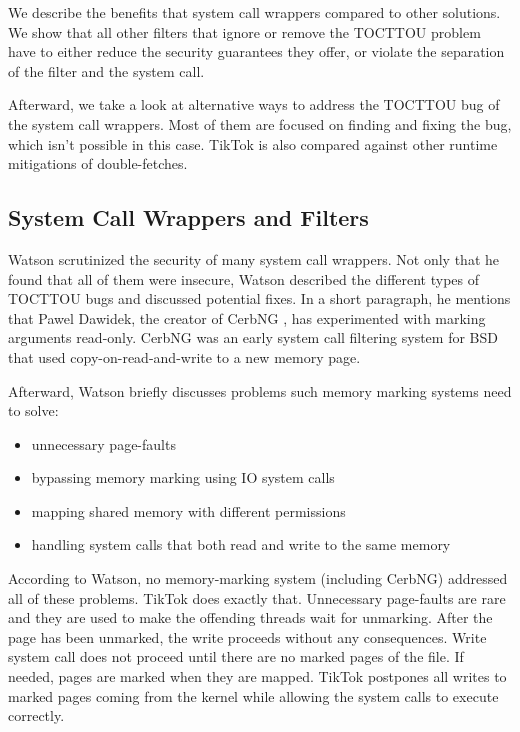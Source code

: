 We describe the benefits that system call wrappers compared to other solutions.
We show that all other filters that ignore or remove the TOCTTOU problem have
to either reduce the security guarantees they offer, or violate the separation
of the filter and the system call.

Afterward, we take a look at alternative ways to address the TOCTTOU bug of the
system call wrappers. Most of them are focused on finding and fixing the bug,
which isn't possible in this case. TikTok is also compared against other runtime
mitigations of double-fetches.

\subsection{System Call Wrappers and Filters}

Watson \cite{watson2007exploiting} scrutinized the security of many system call
wrappers. Not only that he found that all of them were insecure, Watson
described the different types of TOCTTOU bugs and discussed potential fixes. In
a short paragraph, he mentions that Pawel Dawidek, the creator of CerbNG
\cite{zak_frasunek_dawidek}, has experimented with marking arguments read-only.
CerbNG was an early system call filtering system for BSD that used
copy-on-read-and-write to a new memory page.

Afterward, Watson briefly discusses problems such memory marking systems
need to solve: 
\begin{itemize}
    \item unnecessary page-faults
    \item bypassing memory marking using IO system calls
    \item mapping shared memory with different permissions
    \item handling system calls that both read and write to the same memory
\end{itemize}

According to Watson, no memory-marking system (including CerbNG) addressed all
of these problems. TikTok does exactly that. Unnecessary page-faults are rare
and they are used to make the offending threads wait for unmarking. After the
page has been unmarked, the write proceeds without any consequences. Write
system call does not proceed until there are no marked pages of the file. If
needed, pages are marked when they are mapped. TikTok postpones all writes to
marked pages coming from the kernel while allowing the system calls to execute
correctly.


